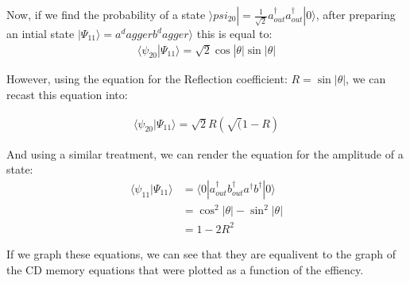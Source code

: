 \documentclass[12pt]{article}
\begin{document}
Now, if we find the probability of a state $\rangle psi_{20} | =\frac{1}{\sqrt{2}} a^\dagger_{out} a^\dagger_{out} | 0 \rangle$, after preparing an intial state $| \Psi_11 \rangle = a^dagger b^dagger \rangle $ this is equal to:
\begin{align}
\langle \psi_{20}|\Psi_{11} \rangle = \sqrt{2} \cos |\theta| \sin |\theta|
\end{align}

However, using the equation for the Reflection coefficient: 
$R = \sin|\theta|$, we can recast this equation into:

\begin{align}
\langle \psi_{20}|\Psi_{11} \rangle = \sqrt{2}  R(\sqrt(1-R)
\end{align}

And using a similar treatment, we can render the equation for the amplitude of a state:
\begin{align}
\langle \psi_{11} | \Psi_{11} \rangle &= \langle 0 | a^\dagger_{out}b^\dagger_{out} a^\dagger b^\dagger |0\rangle\\
&= \cos^2|\theta| - \sin^2|\theta|\\
&= 1-2R^2
\end{align}

If we graph these equations, we can see that they are equalivent to the graph of the CD memory equations that were plotted as a function of the effiency.
\end{document}
